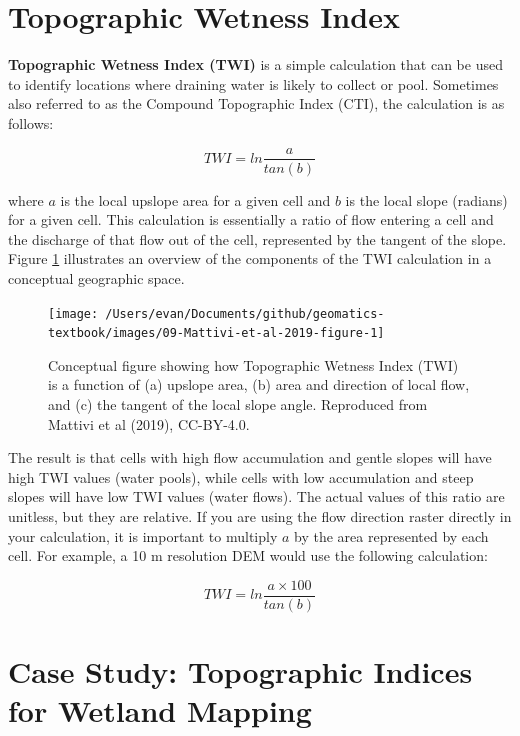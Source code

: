 \documentclass[
]{book}
\begin{document}
\hypertarget{topographic-wetness-index}{%
\section{Topographic Wetness Index}\label{topographic-wetness-index}}

\textbf{Topographic Wetness Index (TWI)} is a simple calculation that can be used to identify locations where draining water is likely to collect or pool. Sometimes also referred to as the Compound Topographic Index (CTI), the calculation is as follows:

\[
TWI=ln\frac{a}{tan(b)}
\]

where \(a\) is the local upslope area for a given cell and \(b\) is the local slope (radians) for a given cell. This calculation is essentially a ratio of flow entering a cell and the discharge of that flow out of the cell, represented by the tangent of the slope. Figure \ref{fig:9-Mattivi-et-al-2019-figure-1} illustrates an overview of the components of the TWI calculation in a conceptual geographic space.

\begin{figure}
\texttt{[image: /Users/evan/Documents/github/geomatics-textbook/images/09-Mattivi-et-al-2019-figure-1]} \caption{Conceptual figure showing how Topographic Wetness Index (TWI) is a function of (a) upslope area, (b) area and direction of local flow, and (c) the tangent of the local slope angle. Reproduced from Mattivi et al (2019), CC-BY-4.0.}\label{fig:9-Mattivi-et-al-2019-figure-1}
\end{figure}

The result is that cells with high flow accumulation and gentle slopes will have high TWI values (water pools), while cells with low accumulation and steep slopes will have low TWI values (water flows). The actual values of this ratio are unitless, but they are relative. If you are using the flow direction raster directly in your calculation, it is important to multiply \(a\) by the area represented by each cell. For example, a 10 m resolution DEM would use the following calculation:

\[
TWI=ln\frac{a×100}{tan(b)}
\]

\hypertarget{case-study-topographic-indices-for-wetland-mapping}{%
\section{Case Study: Topographic Indices for Wetland Mapping}\label{case-study-topographic-indices-for-wetland-mapping}}
\end{document}
